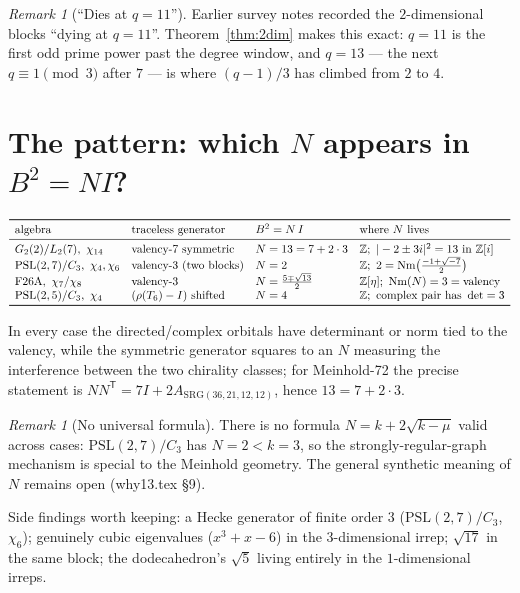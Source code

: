 \documentclass[11pt]{article}
\theoremstyle{remark}
\newtheorem{remark}[theorem]{Remark}
\newcommand{\Z}{\mathbb{Z}}
\newcommand{\Nm}{\operatorname{Nm}}
\newcommand{\T}[1]{T_{#1}}
\begin{document}
\begin{remark}[``Dies at $q=11$'']\label{rem:dies}
Earlier survey notes recorded the $2$-dimensional blocks ``dying at
$q=11$''. Theorem~\ref{thm:2dim} makes this exact: $q=11$ is the first odd
prime power past the degree window, and $q=13$ --- the next $q\equiv1
\pmod3$ after $7$ --- is where $(q-1)/3$ has climbed from $2$ to $4$.
\end{remark}

\section{The pattern: which $N$ appears in $B^2=NI$?}\label{sec:pattern}

\[
\begin{array}{llll}
\toprule
\text{algebra} & \text{traceless generator} & B^2=N\,I & \text{where } N \text{ lives}\\
\midrule
G_2(2)/L_2(7),\ \chi_{14} & \text{valency-7 symmetric} & N=13=7+2\cdot3
  & \Z;\ |-2\pm3i|^2 = 13 \text{ in } \Z[i]\\
\mathrm{PSL}(2,7)/C_3,\ \chi_4,\chi_6 & \text{valency-3 (two blocks)} & N=2
  & \Z;\ 2=\Nm\bigl(\tfrac{-1+\sqrt{-7}}{2}\bigr)\\
\mathrm{F26A},\ \chi_7/\chi_8 & \text{valency-3} & N=\tfrac{5\mp\sqrt{13}}{2}
  & \Z[\eta];\ \Nm(N)=3=\text{valency}\\
\mathrm{PSL}(2,5)/C_3,\ \chi_4 & (\rho(\T6)-I)\ \text{shifted} & N=4
  & \Z;\ \text{complex pair has } \det=3\\
\bottomrule
\end{array}
\]

In every case the directed/complex orbitals have determinant or norm tied
to the valency, while the symmetric generator squares to an $N$ measuring
the interference between the two chirality classes; for Meinhold-72 the
precise statement is $NN^{\mathsf T} = 7I + 2A_{\mathrm{SRG}(36,21,12,12)}$,
hence $13 = 7+2\cdot3$.

\begin{remark}[No universal formula]
There is no formula $N = k + 2\sqrt{k-\mu}$ valid across cases:
$\mathrm{PSL}(2,7)/C_3$ has $N = 2 < k = 3$, so the strongly-regular-graph
mechanism is special to the Meinhold geometry. The general synthetic
meaning of $N$ remains open (\textup{why13.tex} \S9).
\end{remark}

Side findings worth keeping: a Hecke generator of finite order $3$
($\mathrm{PSL}(2,7)/C_3$, $\chi_6$); genuinely cubic eigenvalues
($x^3+x-6$) in the $3$-dimensional irrep; $\sqrt{17}$ in the same block;
the dodecahedron's $\sqrt5$ living entirely in the $1$-dimensional irreps.
\end{document}

